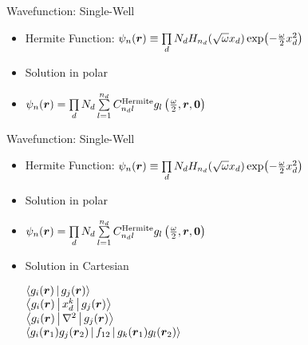 \documentclass[10pt, t, xcolor=dvipsnames]{beamer}
\begin{document}
{{{{{\begin{frame}[fragile]{Wavefunction: Single-Well}
    \begin{itemize}
        \item Hermite Function: $\psi_n(\bm{{r}}) \equiv \prod\limits_d N_d
            H_{n_d}(\sqrt{\omega}x_d)\exp(-\frac{\omega}{2}x^2_d)$
        \item Solution in polar
        \item $\psi_n(\bm{{r}}) = \prod\limits_d N_d \sum\limits^{n_d}_{l=1}
            C^{\text{Hermite}}_{n_dl}
            g_l\left(\frac{\omega}{2},\bm{{r}},\bm{{0}}\right)$
    \end{itemize}
\end{frame}

\begin{frame}[fragile]{Wavefunction: Single-Well}
    \begin{itemize}
        \item Hermite Function: $\psi_n(\bm{{r}}) \equiv \prod\limits_d N_d
            H_{n_d}(\sqrt{\omega}x_d)\exp(-\frac{\omega}{2}x^2_d)$
        \item Solution in polar
        \item $\psi_n(\bm{{r}}) = \prod\limits_d N_d \sum\limits^{n_d}_{l=1}
            C^{\text{Hermite}}_{n_dl}
            g_l\left(\frac{\omega}{2},\bm{{r}},\bm{{0}}\right)$
        \item Solution in Cartesian \\ \vspace{0.2cm} \hspace{1cm}
            \begin{minipage}[H]{0.5\textwidth}
                $\Braket{g_i(\bm{{r}})|g_j(\bm{{r}})}$ \vsp \\
                $\Braket{g_i(\bm{{r}})|x^k_d|g_j(\bm{{r}})}$ \vsp \\
                $\Braket{g_i(\bm{{r}})|\nabla^2|g_j(\bm{{r}})}$ \vsp \\
                $\Braket{g_i(\bm{{r}}_1)g_j(\bm{{r}}_2)|f_{12}|g_k(\bm{{r}}_1)g_l(\bm{{r}}_2)}$ \\
            \end{minipage}
    \end{itemize}
\end{frame}

}}}}}
\end{document}
